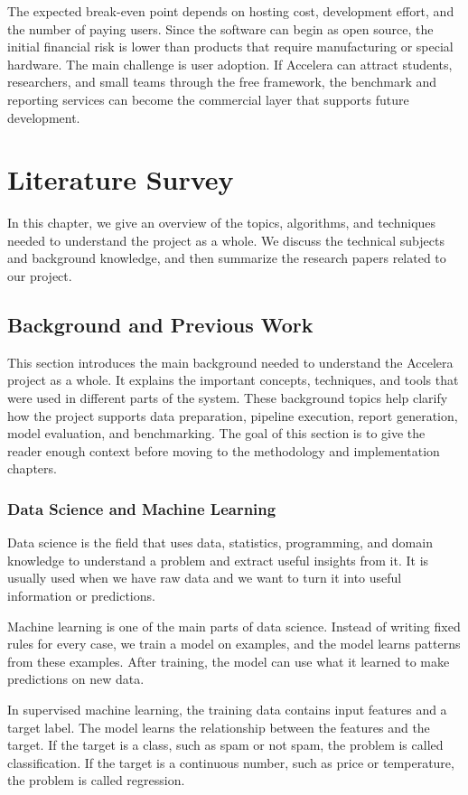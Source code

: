 \documentclass[12pt,a4paper]{report}
\begin{document}
The expected break-even point depends on hosting cost, development effort, and
the number of paying users. Since the software can begin as open source, the
initial financial risk is lower than products that require manufacturing or
special hardware. The main challenge is user adoption. If Accelera can attract
students, researchers, and small teams through the free framework, the benchmark
and reporting services can become the commercial layer that supports future
development.


\chapter{Literature Survey}
In this chapter, we give an overview of the topics, algorithms, and techniques needed to understand the project as a whole. We discuss the technical subjects and background knowledge, and then summarize the research papers related to our project.

\section{Background and Previous Work}
\noindent This section introduces the main background needed to understand the Accelera project as a whole. It explains the important concepts, techniques, and tools that were used in different parts of the system. These background topics help clarify how the project supports data preparation, pipeline execution, report generation, model evaluation, and benchmarking. The goal of this section is to give the reader enough context before moving to the methodology and implementation chapters.

\subsection{Data Science and Machine Learning}
Data science is the field that uses data, statistics, programming, and domain
knowledge to understand a problem and extract useful insights from it. It is
usually used when we have raw data and we want to turn it into useful
information or predictions.

\noindent Machine learning is one of the main parts of data science. Instead of writing
fixed rules for every case, we train a model on examples, and the model learns
patterns from these examples. After training, the model can use what it learned
to make predictions on new data.

\noindent In supervised machine learning, the training data contains input features and a
target label. The model learns the relationship between the features and the
target. If the target is a class, such as spam or not spam, the problem is called
classification. If the target is a continuous number, such as price or
temperature, the problem is called regression.
\end{document}
